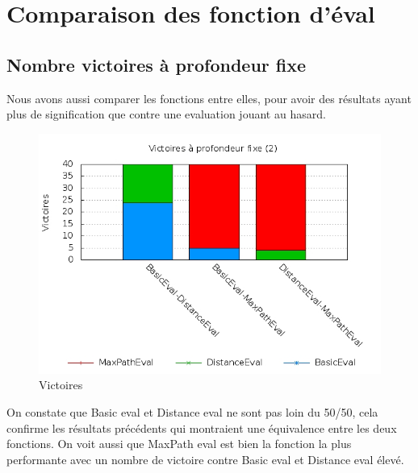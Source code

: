 %

\newpage
\section{Comparaison des fonction d'éval}

	\subsection{Nombre victoires à profondeur fixe}
		
		Nous avons aussi comparer les fonctions entre elles, pour avoir
		des résultats ayant plus de signification que contre une evaluation
		jouant au hasard.
		
		\begin{figure}[h!]
			\centering
			\includegraphics[width=\textwidth]{images/victoireProfFixe.jpg}
			\caption{Victoires}
			\label{fig:stats_victs}
		\end{figure}
		
		On constate que Basic eval et Distance eval ne sont pas loin du 50/50,
		cela confirme les résultats précédents qui montraient une équivalence
		entre les deux fonctions. On voit aussi que MaxPath eval est bien
		la fonction la plus performante avec un nombre de victoire contre 
		Basic eval et Distance eval élevé.
